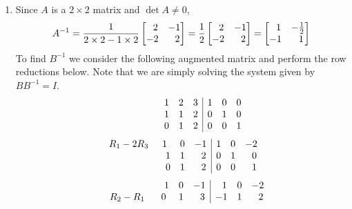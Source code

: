 \documentclass[12pt]{amsart}
\begin{document}
\begin{enumerate}
	\item Since $A$ is a $2\times2$ matrix and $\det A \ne 0$,
		\begin{align}
			A^{-1}=
			\frac{1}{2\times2-1\times2}
			\begin{bmatrix}
				\text{ } \text{ }2 &-1 \\
				-2 &\text{ } \text{ }2
			\end{bmatrix} =
			\frac{1}{2}\begin{bmatrix}
				\text{ } \text{ }2 &-1 \\
				-2 &\text{ } \text{ }2
			\end{bmatrix} =
			\begin{bmatrix}
				\text{ } \text{ }1 &-\frac{1}{2} \\
				-1 &\text{ } \text{ }1
			\end{bmatrix} \notag
		\end{align}
		To find $B^{-1}$ we consider the following augmented matrix and perform the row reductions 
		below. Note that we are simply solving the system given by $BB^{-1}=I$.	
		\begin{align}
			\begin{array}{ccc|ccc}
				\hspace{1.6cm} 1 &2 &3 &1 &0 &0 \\
				\hspace{1.6cm} 1 &1 &2 &0 &1 &0  \\
				\hspace{1.6cm} 0 &1&2 &0 &0 &1
			\end{array} \notag
		\end{align} 
		\begin{align}
			\begin{array}{ccc|ccc}
				R_1-2R_3 \hspace{0.5cm} 1 &0 &-1 &1 &0 &-2 \\
				\hspace{2.2cm} 1 &1 &\text{ } \text{ }2 &0 &1 &\text{ } \text{ }0  \\
				\hspace{2.2cm} 0& 1&\text{ } \text{ }2 &0 &0 &\text{ } \text{ }1
			\end{array} \notag
		\end{align} 
		\begin{align}
			\begin{array}{ccc|ccc}
				\hspace{2.4cm} 1 &0 &-1 &\text{ } \text{ }1 &0 &-2 \\
				\hspace{0.3cm} R_2-R_1 \hspace{0.6cm} 0 &1 &\text{ } \text{ }3 &-1 &1 &\text{ } \text{ }2  \\

\end{array}
\end{align}
\end{enumerate}
\end{document}
